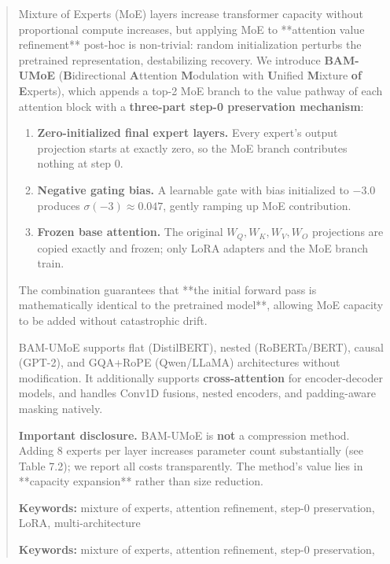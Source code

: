 \documentclass{article}
\begin{document}
\maketitle

\begin{abstract}
Mixture of Experts (MoE) layers increase transformer capacity without 
proportional compute increases, but applying MoE to **attention value 
refinement** post-hoc is non-trivial: random initialization perturbs the 
pretrained representation, destabilizing recovery. We introduce \textbf{BAM-UMoE} 
(\textbf{B}idirectional \textbf{A}ttention \textbf{M}odulation with \textbf{U}nified \textbf{M}ixture 
\textbf{of E}xperts), which appends a top-2 MoE branch to the value pathway of 
each attention block with a \textbf{three-part step-0 preservation mechanism}:

\begin{enumerate}
\item \textbf{Zero-initialized final expert layers.} Every expert's output projection
  starts at exactly zero, so the MoE branch contributes nothing at step 0.
\item \textbf{Negative gating bias.} A learnable gate with bias initialized to $-3.0$
  produces $\sigma(-3) \approx 0.047$, gently ramping up MoE contribution.
\item \textbf{Frozen base attention.} The original $W_Q, W_K, W_V, W_O$ projections
  are copied exactly and frozen; only LoRA adapters and the MoE branch train.

\end{enumerate}
The combination guarantees that **the initial forward pass is mathematically 
identical to the pretrained model**, allowing MoE capacity to be added without 
catastrophic drift.

BAM-UMoE supports flat (DistilBERT), nested (RoBERTa/BERT), causal (GPT-2), 
and GQA+RoPE (Qwen/LLaMA) architectures without modification. It additionally 
supports \textbf{cross-attention} for encoder-decoder models, and handles Conv1D 
fusions, nested encoders, and padding-aware masking natively.

\textbf{Important disclosure.} BAM-UMoE is \textbf{not} a compression method. Adding 
8 experts per layer increases parameter count substantially (see Table 7.2); 
we report all costs transparently. The method's value lies in **capacity 
expansion** rather than size reduction.

\textbf{Keywords:} mixture of experts, attention refinement, step-0 preservation, 
LoRA, multi-architecture



\vspace{0.5em}
\noindent\textbf{Keywords:} mixture of experts, attention refinement, step-0 preservation,
\end{abstract}
\end{document}
